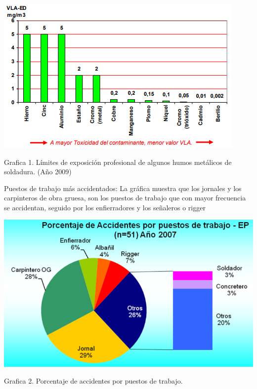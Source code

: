 \documentclass[12pt,letterpaper]{article}
\begin{document}
\begin{center}
\includegraphics[scale=1]{imag2.png}  
\end{center}
\begin{center}
Grafica 1. Límites de exposición profesional de algunos humos metálicos de soldadura. (Año 2009)
\end{center}

\newpage
\begin{flushleft}
Puestos de trabajo más accidentados: 
La gráfica muestra que los jornales y los carpinteros de obra gruesa, son los puestos de trabajo que con mayor frecuencia se accidentan, seguido por los enfierradores y los señaleros o rigger
\end{flushleft}
\begin{center}
\includegraphics[scale=0.9]{imag3.png}  
\end{center}
\begin{center}
Grafica 2. Porcentaje de accidentes por puestos de trabajo.
\end{center}
\end{document}
